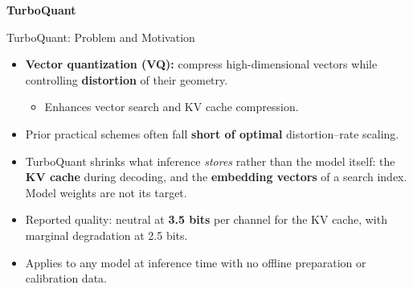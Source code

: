 \begin{frame}[plain]
  \centering
  \vfill
  {\LARGE\bfseries TurboQuant}
  \vfill
\end{frame}

\begin{frame}{TurboQuant: Problem and Motivation}
    \begin{itemize}\itemsep0.28em
      \item[\textcolor{red}{$\blacktriangleright$}] \textbf{Vector quantization (VQ):} compress high-dimensional vectors while controlling \textbf{distortion} of their geometry.
      \begin{itemize}
      \item[\textcolor{red}{$\blacktriangleright$}] Enhances vector search and KV cache compression.
      \end{itemize}
      \item[\textcolor{red}{$\blacktriangleright$}] Prior practical schemes often fall \textbf{short of optimal} distortion--rate scaling.
      \item[\textcolor{red}{$\blacktriangleright$}] TurboQuant shrinks what inference \emph{stores} rather than the model itself: the \textbf{KV cache} during decoding, and the \textbf{embedding vectors} of a search index. Model weights are not its target.
      \item[\textcolor{red}{$\blacktriangleright$}] Reported quality: neutral at \textbf{3.5 bits} per channel for the KV cache, with marginal degradation at 2.5 bits.
      \item[\textcolor{red}{$\blacktriangleright$}] Applies to any model at inference time with no offline preparation or calibration data.
    \end{itemize}
\end{frame}


